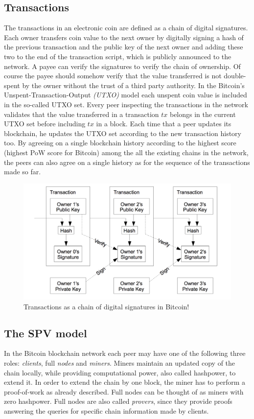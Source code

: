 \subsection{Transactions}
The transactions in an electronic coin are defined as a chain of digital signatures. Each owner transfers coin value to the next owner by digitally signing a hash of the previous transaction and the public key of the next owner and adding these two to the end of the transaction script, which is publicly announced to the network. A payee can verify the signatures to verify the chain of ownership. Of course the payee should somehow verify that the value transferred is not double-spent by the owner without the trust of a third party authority. In the Bitcoin's Unspent-Transaction-Output \emph{(UTXO)} model each unspent coin value is included in the so-called UTXO set. Every peer inspecting the transactions in the network validates that the value transferred in a transaction $tx$ belongs in the current UTXO set before including $tx$ in a block. Each time that a peer updates its blockchain, he updates the UTXO set according to the new transaction history too. By agreeing on a single blockchain history according to the highest score (highest PoW score for Bitcoin) among the all the existing chains in the network, the peers can also agree on a single history as for the sequence of the transactions made so far.

\begin{figure}[h!]
	\begin{center}
		\includegraphics[scale=0.3]{figures/txs.png}
	\end{center}
	\caption{Transactions as a chain of digital signatures in Bitcoin!\cite{nakamoto}}
	\label{fig:txs_nakamoto}
\end{figure}


\subsection{The SPV model}
In the Bitcoin blockchain network each peer may have one of the following three roles: \textit{clients}, full \textit{nodes} and \textit{miners}. Miners maintain an updated copy of the chain locally, while providing computational power, also called hashpower, to extend it. In order to extend the chain by one block, the miner has to perform a proof-of-work as already described. Full nodes can be thought of as miners with zero hashpower. Full nodes are also called \textit{provers}, since they provide proofs  answering the queries for specific chain information made by clients.

